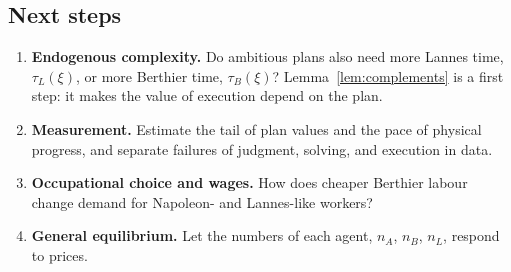\documentclass[11pt]{article}
\newcommand{\Nap}{\textcolor{nap}{Napoleon}}
\newcommand{\Ber}{\textcolor{ber}{Berthier}}
\newcommand{\Lan}{\textcolor{lan}{Lannes}}
\theoremstyle{remark}
\begin{document}
\subsection{Next steps}

\begin{enumerate}
  \item \textbf{Endogenous complexity.} Do ambitious plans also need more \Lan{} time, $\tau_L(\xi)$, or more \Ber{} time, $\tau_B(\xi)$? Lemma~\ref{lem:complements} is a first step: it makes the value of execution depend on the plan.
  \item \textbf{Measurement.} Estimate the tail of plan values and the pace of physical progress, and separate failures of judgment, solving, and execution in data.
  \item \textbf{Occupational choice and wages.} How does cheaper \Ber{} labour change demand for \Nap- and \Lan-like workers?
  \item \textbf{General equilibrium.} Let the numbers of each agent, $n_A$, $n_B$, $n_L$, respond to prices.
\end{enumerate}
\end{document}
